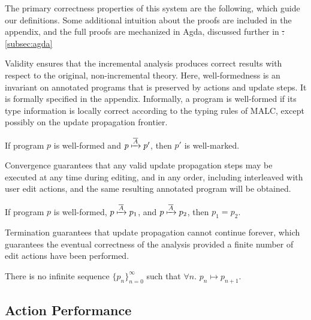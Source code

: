 \documentclass[acmsmall,dvipsnames,10pt,nonacm]{acmart}\settopmatter{printfolios=true} %
\makeatletter
\newcommand{\PV}{\ensuremath{p}}
\newcommand{\LAV}{\ensuremath{A}}
\newcommand{\StepProg}[2]{\ensuremath{#1\mapsto#2}} %
\newcommand{\ActStep}[3]{#2\xmapsto{#1}#3}
\providecommand{\DIFadd}[1]{{\protect\color{blue}\uwave{#1}}} %
\providecommand{\DIFdel}[1]{{\protect\color{red}\sout{#1}}} %
\providecommand{\DIFaddbegin}{} %
\providecommand{\DIFaddend}{} %
\providecommand{\DIFdelbegin}{} %
\providecommand{\DIFdelend}{} %
\newcommand{\DIFscaledelfig}{0.5}
\newlength{\DIFdelgraphicswidth} %
\newlength{\DIFdelgraphicsheight} %
\newcommand{\DIFaddincludegraphics}[2][]{{\color{blue}\fbox{\DIFOincludegraphics[#1]{#2}}}} %
\newcommand{\DIFdelincludegraphics}[2][]{%
\sbox{\DIFdelgraphicsbox}{\DIFOincludegraphics[#1]{#2}}%
\settoboxwidth{\DIFdelgraphicswidth}{\DIFdelgraphicsbox} %
\settoboxtotalheight{\DIFdelgraphicsheight}{\DIFdelgraphicsbox} %
\scalebox{\DIFscaledelfig}{%
\parbox[b]{\DIFdelgraphicswidth}{\usebox{\DIFdelgraphicsbox}\\[-\baselineskip] \rule{\DIFdelgraphicswidth}{0em}}\llap{\resizebox{\DIFdelgraphicswidth}{\DIFdelgraphicsheight}{%
\setlength{\unitlength}{\DIFdelgraphicswidth}%
\begin{picture}(1,1)%
\thicklines\linethickness{2pt} %
{\color[rgb]{1,0,0}\put(0,0){\framebox(1,1){}}}%
{\color[rgb]{1,0,0}\put(0,0){\line( 1,1){1}}}%
{\color[rgb]{1,0,0}\put(0,1){\line(1,-1){1}}}%
\end{picture}%
}\hspace*{3pt}}} %
} %
\DeclareRobustCommand{\DIFaddbegin}{\DIFOaddbegin \let\includegraphics\DIFaddincludegraphics} %
\DeclareRobustCommand{\DIFaddend}{\DIFOaddend \let\includegraphics\DIFOincludegraphics} %
\DeclareRobustCommand{\DIFdelbegin}{\DIFOdelbegin \let\includegraphics\DIFdelincludegraphics} %
\DeclareRobustCommand{\DIFdelend}{\DIFOaddend \let\includegraphics\DIFOincludegraphics} %
\let\sout@orig\sout %
\renewcommand{\sout}[1]{\ifmmode\text{\sout@orig{\ensuremath{#1}}}\else\sout@orig{#1}\fi} %
\makeatother
\begin{document}
The primary correctness properties of this system are the following, which guide our definitions. Some additional intuition about the proofs are included in the appendix, and the full proofs are mechanized in Agda, discussed further in \DIFdelbegin %
\DIFdel{:
}\DIFdelend \DIFaddbegin \autoref{subsec:agda}\DIFadd{.
}\DIFaddend 

Validity ensures that the incremental analysis produces correct results with respect to the original, non-incremental theory. Here, well-formedness is an invariant on annotated programs that is preserved by actions and update steps. It is formally specified in the appendix. Informally, a program is well-formed if its type information is locally correct according to the typing rules of MALC, except possibly on the update propagation frontier. 

\begin{theorem}[Validity]
    If program $\PV$ is well-formed and $\ActStep{\overline{\LAV}}{\PV}{\PV'}$, then $\PV'$ is well-marked. 
\end{theorem}

Convergence guarantees that any valid update propagation steps may be executed at any time during editing, and in any order, including interleaved with user edit actions, and the same resulting annotated program will be obtained. 
\begin{theorem}[Convergence]
    If program $\PV$ is well-formed, $\ActStep{\overline{\LAV}}{\PV}{\PV_1}$, and $\ActStep{\overline{\LAV}}{\PV}{\PV_2}$, then $\PV_1=\PV_2$. 
\end{theorem}

Termination guarantees that update propagation cannot continue forever, which guarantees the eventual correctness of the analysis provided a finite number of edit actions have been performed. %
\begin{theorem}[Termination]
    There is no infinite sequence $\{\PV_n\}_{n= 0}^\infty$ such that $\forall n$. $\StepProg{\PV_n}{\PV_{n+1}}$. 
\end{theorem}



\subsection{Action Performance}
\DIFaddbegin \label{subsec:actions}
\DIFaddend 
\end{document}
